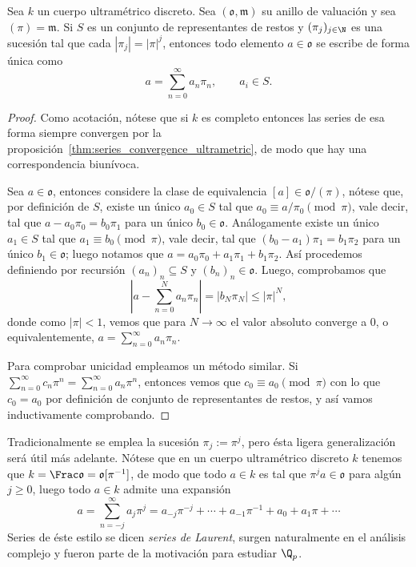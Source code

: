 \documentclass[teoria-numeros.tex]{subfiles}
\begin{document}
\begin{prop}\label{thm:power_series_exp}
	Sea $k$ un cuerpo ultramétrico discreto.
	Sea $(\mathfrak{o}, \mathfrak{m})$ su anillo de valuación y sea $(\pi) = \mathfrak{m}$.
	Si $S$ es un conjunto de representantes de restos y $(\pi_j)_{j\in\N}$ es una sucesión tal que cada $|\pi_j| = |\pi|^j$,
	entonces todo elemento $a \in \mathfrak{o}$ se escribe de forma única como
	$$ a = \sum_{n=0}^{\infty} a_n\pi_n, \qquad a_i \in S. $$
\end{prop}
\begin{proof}
	Como acotación, nótese que si $k$ es completo entonces las series de esa forma siempre convergen
	por la proposición~\ref{thm:series_convergence_ultrametric}, de modo que hay una correspondencia biunívoca.

	Sea $a \in \mathfrak{o}$, entonces considere la clase de equivalencia $[a] \in \mathfrak{o}/(\pi)$, nótese que, por definición de $S$, existe un
	único $a_0 \in S$ tal que $a_0 \equiv a/\pi_0 \pmod\pi$, vale decir, tal que $a - a_0\pi_0 = b_0\pi_1$ para un único $b_0 \in \mathfrak{o}$.
	Análogamente existe un único $a_1 \in S$ tal que $a_1 \equiv b_0 \pmod\pi$, vale decir, tal que $(b_0 - a_1)\pi_1 = b_1 \pi_2$ para un único
	$b_1 \in \mathfrak{o}$; luego notamos que $a = a_0\pi_0 + a_1\pi_1 + b_1\pi_2$.
	Así procedemos definiendo por recursión $(a_n)_n \subseteq S$ y $(b_n)_n \in \mathfrak{o}$.
	Luego, comprobamos que
	$$ \left| a - \sum_{n=0}^{N} a_n\pi_n \right| = |b_N\pi_N| \le |\pi|^N, $$
	donde como $|\pi| < 1$, vemos que para $N \to \infty$ el valor absoluto converge a 0, o equivalentemente, $a = \sum_{n=0}^{\infty} a_n\pi_n$.

	Para comprobar unicidad empleamos un método similar.
	Si $\sum_{n=0}^{\infty} c_n\pi^n = \sum_{n=0}^{\infty} a_n\pi^n$, entonces vemos que $c_0 \equiv a_0 \pmod \pi$ con lo que $c_0 = a_0$ por definición
	de conjunto de representantes de restos, y así vamos inductivamente comprobando.
\end{proof}
Tradicionalmente se emplea la sucesión $\pi_j := \pi^j$, pero ésta ligera generalización será útil más adelante.
Nótese que en un cuerpo ultramétrico discreto $k$ tenemos que $k = \Frac \mathfrak{o} = \mathfrak{o}[\pi^{-1}]$, de modo que todo $a \in k$
es tal que $\pi^j a \in \mathfrak{o}$ para algún $j \ge 0$, luego todo $a \in k$ admite una expansión
$$ a = \sum_{n=-j}^{\infty} a_j \pi^j = a_{-j}\pi^{-j} + \cdots + a_{-1}\pi^{-1} + a_0 + a_1\pi + \cdots $$
Series de éste estilo se dicen \textit{series de Laurent}, surgen naturalmente en el análisis complejo y fueron parte de la motivación para estudiar $\Q_p$.
\end{document}
